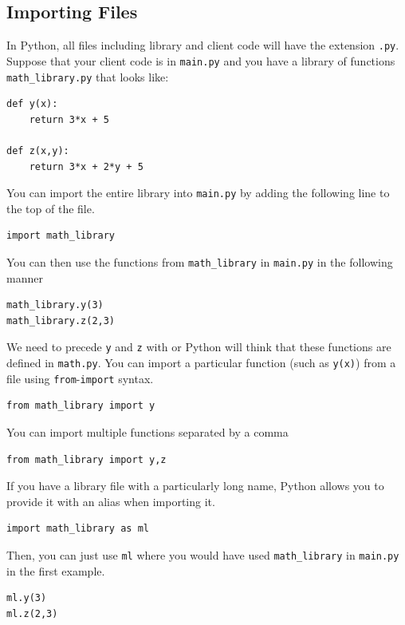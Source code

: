 \documentclass{article}
\begin{document}
\subsection{Importing Files}
In Python, all files including library and client code will have the extension \texttt{.py}. Suppose that your client code is in \texttt{main.py} and you have a library of functions \texttt{math\_library.py} that looks like:
\begin{verbatim}
def y(x):
    return 3*x + 5

def z(x,y):
    return 3*x + 2*y + 5
\end{verbatim}
You can import the entire library into \texttt{main.py} by adding the following line to the top of the file.
\begin{verbatim}
import math_library
\end{verbatim}
You can then use the functions from \texttt{math\_library} in \texttt{main.py} in the following manner
\begin{verbatim}
math_library.y(3)
math_library.z(2,3)
\end{verbatim}
We need to precede \texttt{y} and \texttt{z} with  or Python will think that these functions are defined in \texttt{math.py}. You can import a particular function (such as \texttt{y(x)}) from a file using \texttt{from}-\texttt{import} syntax.
\begin{verbatim}
from math_library import y
\end{verbatim}
You can import multiple functions separated by a comma
\begin{verbatim}
from math_library import y,z
\end{verbatim}
If you have a library file with a particularly long name, Python allows you to provide it with an alias when importing it. 
\begin{verbatim}
import math_library as ml
\end{verbatim}
Then, you can just use \texttt{ml} where you would have used \texttt{math\_library} in \texttt{main.py} in the first example.
\begin{verbatim}
ml.y(3)
ml.z(2,3)
\end{verbatim}
\end{document}
